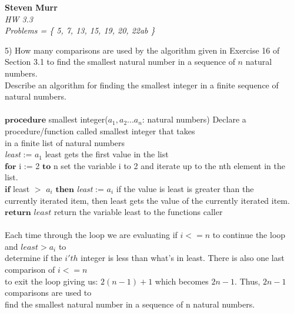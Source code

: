 \documentclass{article}
\begin{document}
\setcounter{totalnumber}{5}
   \begin{flushright}
      \Large\textbf{Steven Murr}\\
      \large\textit{HW 3.3} \\
      \large\textit{ Problems = \{ 5, 7, 13, 15, 19, 20, 22ab \} }
   \end{flushright}
\begin{flushleft}
\makeatletter%
\setlength{\@fptop}{5pt}
\makeatother
\setlength\parindent{0pt}5) How many comparisons are used by the algorithm given in Exercise 16 of Section 3.1 to find the smallest natural number in a sequence of $n$ natural numbers. \\
\setlength\parindent{0pt}\setlength\parindent{0pt}Describe an algorithm for finding the smallest integer in a finite sequence of natural numbers. \\
~\\
\setlength\parindent{24pt}$\textbf{procedure}$ smallest integer($a_1, a_2 . . . a_n$: natural numbers) {\tiny Declare a procedure/function called smallest integer that takes \\in a finite list of natural numbers}\\
\setlength\parindent{24pt}\textit{least} := $a_1$ {\tiny least gets the first value in the list}\\
\setlength\parindent{24pt}$\textbf{for}$ i := 2 $\textbf{to}$ n {\tiny set the variable i to 2 and iterate up to the nth element in the list.}\\
\setlength\parindent{48pt} $\textbf{if}$ least $>$ $a_i$ $\textbf{then}$ \textit{least} := $a_i$ {\tiny if the value is least is greater than the \\currently iterated item, then least gets the value of the currently iterated item.}\\ 
\setlength\parindent{24pt} $\textbf{return}$ $\textit{least}$ {\tiny return the variable least to the functions caller} \\
~\\
\setlength\parindent{24pt}Each time through the loop we are evaluating if $i <= n$ to continue the loop and $least > a_i$ to \\determine if the $i'th$ integer is less than what's in least.  There is also one last comparison of $i <= n$ \\to exit the loop giving us: $2(n-1) + 1$ which becomes $2n -1$.  Thus, $2n - 1$ comparisons are used to \\find the smallest natural number in a sequence of n natural numbers.\\


\end{flushleft}
\end{document}
